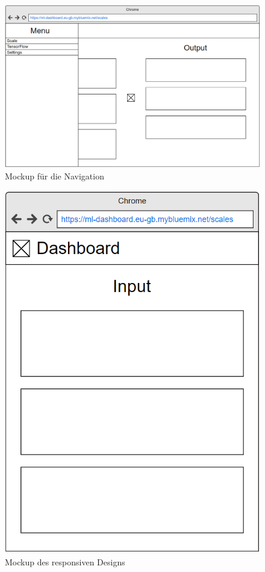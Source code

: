 \begin{figure}[h]
    \centering
    \includegraphics[width=\textwidth]{images/kapitel_4/mockup_scale_menu.png}
    \caption{Mockup für die Navigation}
    \label{fig:umsetzung_mockup_scale_menu}
\end{figure}

\begin{figure}[h]
    \centering
    \includegraphics[scale=0.5]{images/kapitel_4/mockup_scale_responsive.png}
    \caption{Mockup des responsiven Designs}
    \label{fig:umsetzung_mockup_scale_responsive}
\end{figure}

